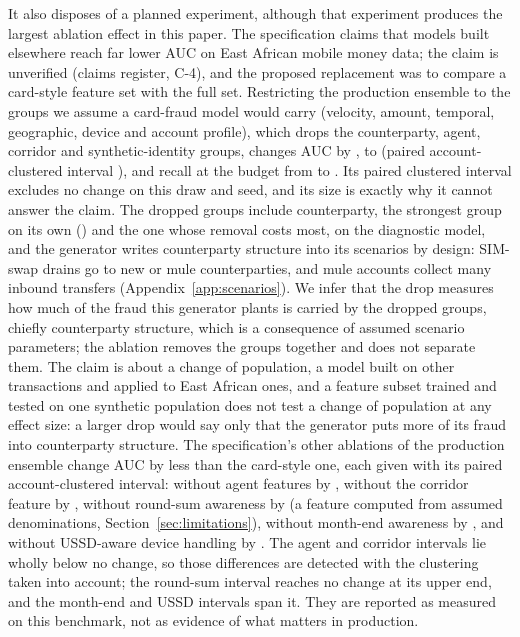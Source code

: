 It also disposes of a planned experiment, although that experiment produces the largest ablation
effect in this paper. The specification claims that models built elsewhere reach far lower AUC on
East African mobile money data; the claim is unverified (claims register, C-4), and the proposed
replacement was to compare a card-style feature set with the full set. Restricting the production
ensemble to the groups we assume a card-fraud model would carry (velocity, amount, temporal,
geographic, device and account profile), which drops the counterparty, agent, corridor and
synthetic-identity groups, changes AUC by \nAblCardD{}, to \nAblCardAUC{} (paired account-clustered
interval \nAblCardDiffci{}), and recall at the \nFPRBudget{} budget from \nGateRecallFPR{} to
\nAblCardR{}.
Its paired clustered interval excludes no change on this draw and seed, and its size is exactly why it
cannot answer the claim. The
dropped groups include counterparty, the strongest group on its own (\nGroupCounterparty{}) and the
one whose removal costs most, \nGroupMaxDrop{} on the diagnostic model, and the generator writes counterparty
structure into its scenarios by design: SIM-swap drains go to new or mule counterparties, and mule
accounts collect many inbound transfers (Appendix~\ref{app:scenarios}). We infer that the drop
measures how much of the fraud this generator plants is carried by the dropped groups, chiefly
counterparty structure, which is a consequence of assumed scenario parameters; the ablation removes
the groups together and does not separate them. The claim is about a change of population,
a model built on other transactions and applied to East African ones, and a feature subset trained
and tested on one synthetic population does not test a change of population at any effect size: a
larger drop would say only that the generator puts more of its fraud into counterparty structure.
The specification's other ablations of the production ensemble change AUC by less than the card-style
one, each given with its paired account-clustered interval: without agent features by \nAblAgentD{} \nAblAgentDiffci{}, without the corridor
feature by \nAblCorridorD{} \nAblCorridorDiffci{}, without round-sum awareness by \nAblRoundD{}
\nAblRoundDiffci{} (a feature computed from assumed denominations, Section~\ref{sec:limitations}),
without month-end awareness by \nAblMonthD{} \nAblMonthDiffci{}, and without USSD-aware device
handling by \nAblUSSDD{} \nAblUSSDDiffci{}. The agent and corridor intervals lie wholly below no
change, so those differences are detected with the clustering taken into account; the round-sum
interval reaches no change at its upper end, and the month-end and USSD intervals span it. They are
reported as measured on this benchmark, not as evidence of what matters in production.

